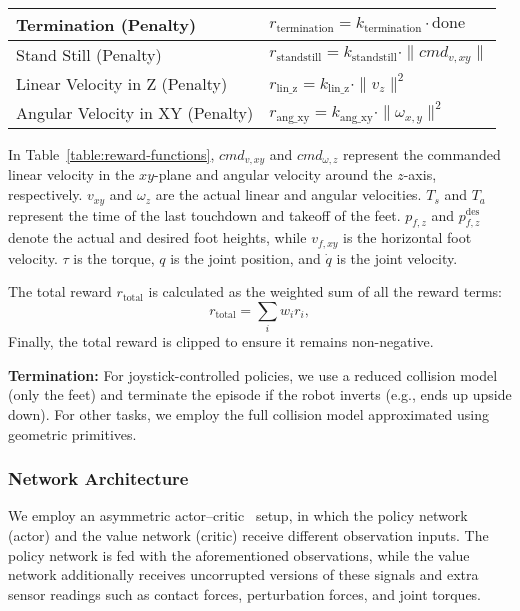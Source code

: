 \begin{table}[h!]
\begin{tabular}{|l|l|}
Termination (Penalty)            & $r_\text{termination} = k_\text{termination} \cdot \text{done}$                                            \\ \hline
Stand Still (Penalty)            & $r_\text{standstill} = k_\text{standstill} \cdot \|cmd_{v,xy}\|$                                           \\ \hline
Linear Velocity in Z (Penalty)   & $r_\text{lin\_z} = k_\text{lin\_z} \cdot \|v_{z}\|^2$                                                      \\ \hline
Angular Velocity in XY (Penalty) & $r_\text{ang\_xy} = k_\text{ang\_xy} \cdot \|\omega_{x,y}\|^2$                                             \\ \hline
\end{tabular}
\end{table}

In Table~\ref{table:reward-functions}, $cmd_{v,xy}$ and $cmd_{\omega,z}$ represent the commanded linear velocity in the $xy$-plane and angular velocity around the $z$-axis, respectively. $v_{xy}$ and $\omega_z$ are the actual linear and angular velocities. $T_s$ and $T_a$ represent the time of the last touchdown and takeoff of the feet. $p_{f,z}$ and $p^\text{des}_{f,z}$ denote the actual and desired foot heights, while $v_{f,xy}$ is the horizontal foot velocity. $\tau$ is the torque, $q$ is the joint position, and $\dot{q}$ is the joint velocity.

The total reward $r_\text{total}$ is calculated as the weighted sum of all the reward terms:
\[
r_\text{total} = \sum_i w_i r_i,
\]
Finally, the total reward is clipped to ensure it remains non-negative.

\textbf{Termination:} For joystick-controlled policies, we use a reduced collision model (only the feet) and terminate the episode if the robot inverts (e.g., ends up upside down). For other tasks, we employ the full collision model approximated using geometric primitives.

\subsubsection{Network Architecture}

We employ an asymmetric actor--critic~\cite{pinto2018asymmetric} setup, in which the policy network (actor) and the value network (critic) receive different observation inputs. The policy network is fed with the aforementioned observations, while the value network additionally receives uncorrupted versions of these signals and extra sensor readings such as contact forces, perturbation forces, and joint torques.


